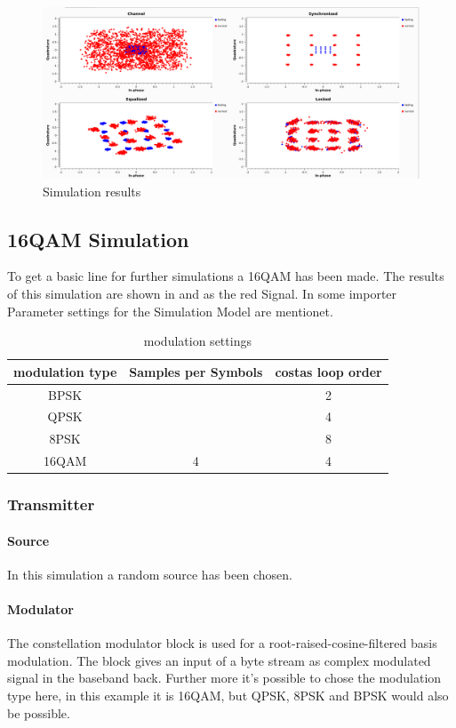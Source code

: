 \begin{figure}
	\includegraphics[width=14cm]{./figures/screenshots/QAM16_Fading_2_.png}
	\caption{Simulation results}
	\label{fig:simul16QAM_1}	
\end{figure}

\subsection{16QAM Simulation}
To get a basic line for further simulations a 16QAM has been made. The results of this simulation are shown in  and  as the red Signal. In  some importer Parameter settings for the Simulation Model are mentionet.

\begin{table}[]
	\caption{modulation settings}
	\begin{tabular}[h]{|c|c|c|}
		\hline
		modulation type & Samples per Symbols & costas loop order\\
		\hline
		BPSK & & 2\\
		\hline
		QPSK & & 4\\
		\hline
		8PSK & & 8\\
		\hline 
		16QAM & 4 & 4 \\
		\hline
	\end{tabular}
	\label{tab:modulation_settings}
\end{table}


\subsubsection{Transmitter}
\paragraph{Source}
In this simulation a random source has been chosen.
\paragraph{Modulator}
The constellation modulator block is used for a root-raised-cosine-filtered basis modulation. The block gives an input of a byte stream as complex modulated signal in the baseband back. 
Further more it's possible to chose the modulation type here, in this example it is 16QAM, but QPSK, 8PSK and BPSK would also be possible.


